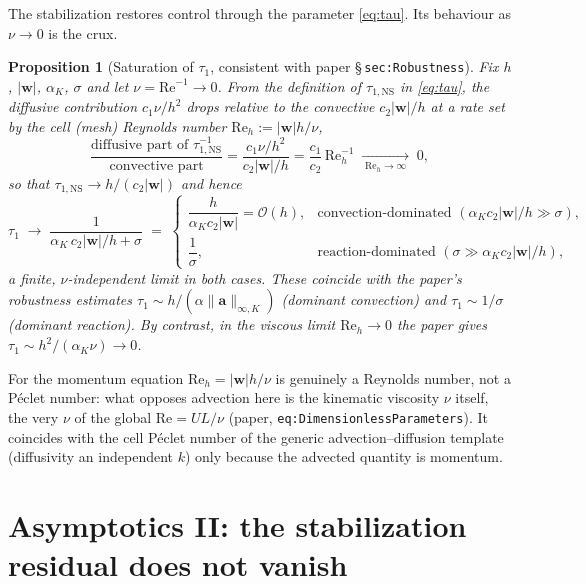 \documentclass[11pt]{article}
\newcommand{\bw}{\boldsymbol{w}}
\newcommand{\ba}{\boldsymbol{a}}
\newcommand{\tauNS}{\tau_{1,\mathrm{NS}}}
\newcommand{\Reyn}{\mathrm{Re}}
\newcommand{\bigOh}{\mathcal{O}}
\newtheorem{proposition}{Proposition}
\begin{document}
The stabilization restores control through the parameter \eqref{eq:tau}. Its
behaviour as $\nu\to0$ is the crux.

\begin{proposition}[Saturation of $\tau_1$, consistent with paper \S\,\texttt{sec:Robustness}]\label{prop:tau}
Fix $h$, $|\bw|$, $\alpha_K$, $\sigma$ and let $\nu=\Reyn^{-1}\to0$. From the
definition of $\tauNS$ in \eqref{eq:tau}, the diffusive contribution
$c_1\nu/h^2$ drops relative to the convective $c_2|\bw|/h$ at a rate set by the
cell (mesh) Reynolds number $\Reyn_h:=|\bw|h/\nu$,
\begin{equation}
  \frac{\text{diffusive part of }\tauNS^{-1}}{\text{convective part}}
  =\frac{c_1\nu/h^2}{c_2|\bw|/h}
  =\frac{c_1}{c_2}\,\Reyn_h^{-1}\;\xrightarrow[\;\Reyn_h\to\infty\;]{}\;0,
  \label{eq:ratio}
\end{equation}
so that $\tauNS\to h/(c_2|\bw|)$ and hence
\begin{equation}
  \tau_1\;\longrightarrow\;\frac{1}{\alpha_K\,c_2|\bw|/h+\sigma}
  \;=\;
  \begin{cases}
    \dfrac{h}{\alpha_K c_2|\bw|}=\bigOh(h), & \text{convection-dominated }(\alpha_K c_2|\bw|/h\gg\sigma),\\[1.4ex]
    \dfrac{1}{\sigma}, & \text{reaction-dominated }(\sigma\gg\alpha_K c_2|\bw|/h),
  \end{cases}
  \label{eq:tausat}
\end{equation}
a finite, $\nu$-independent limit in both cases. These coincide with the paper's
robustness estimates $\tau_1\sim h/(\alpha\lVert\ba\rVert_{\infty,K})$ (dominant
convection) and $\tau_1\sim1/\sigma$ (dominant reaction). By contrast, in the
viscous limit $\Reyn_h\to0$ the paper gives $\tau_1\sim h^2/(\alpha_K\nu)\to0$.
\end{proposition}

For the momentum equation $\Reyn_h=|\bw|h/\nu$ is genuinely a Reynolds number, not
a P\'eclet number: what opposes advection here is the kinematic viscosity $\nu$
itself, the very $\nu$ of the global $\Reyn=UL/\nu$ (paper,
\texttt{eq:DimensionlessParameters}). It coincides with the cell P\'eclet number
of the generic advection--diffusion template (diffusivity an independent $k$) only
because the advected quantity is momentum.

\section{Asymptotics II: the stabilization residual does not vanish}\label{sec:rS}
\end{document}
